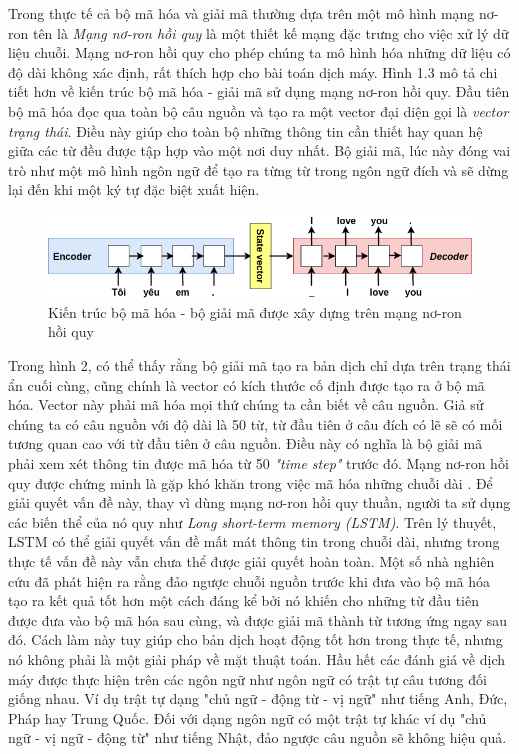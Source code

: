 Trong thực tế cả bộ mã hóa và giải mã thường dựa trên một mô hình mạng nơ-ron tên là \textit{Mạng nơ-ron hồi quy} là một thiết kế mạng đặc trưng cho việc xử lý dữ liệu chuỗi. Mạng nơ-ron hồi quy cho phép chúng ta mô hình hóa những dữ liệu có độ dài không xác định, rất thích hợp cho bài toán dịch máy. Hình 1.3 mô tả chi tiết hơn về kiến trúc bộ mã hóa - giải mã sử dụng mạng nơ-ron hồi quy. Đầu tiên bộ mã hóa đọc qua toàn bộ câu nguồn và tạo ra một vector đại diện gọi là \textit{vector trạng thái}. Điều này giúp cho toàn bộ những thông tin cần thiết hay quan hệ giữa các từ đều được tập hợp vào một nơi duy nhất. Bộ giải mã, lúc này đóng vai trò như một mô hình ngôn ngữ để tạo ra từng từ trong ngôn ngữ đích và sẽ dừng lại đến khi một ký tự đặc biệt xuất hiện.

\begin{figure}
	\centering
	\includegraphics[width=\textwidth]{encoder-decoder}
	\caption[Kiến trúc bộ mã hóa - bộ giải mã được xây dựng trên mạng nơ-ron hồi quy]{Kiến trúc bộ mã hóa - bộ giải mã được xây dựng trên mạng nơ-ron hồi quy}
	\label{fig_encoder_decoder_details}
\end{figure}

Trong hình 2, có thể thấy rằng bộ giải mã tạo ra bản dịch chỉ dựa trên trạng thái ẩn cuối cùng, cũng chính là vector có kích thước cố định được tạo ra ở bộ mã hóa. Vector này phải mã hóa mọi thứ chúng ta cần biết về câu nguồn. Giả sử chúng ta có câu nguồn với độ dài là 50 từ, từ đầu tiên ở câu đích có lẽ sẽ có mối tương quan cao với từ đầu tiên ở câu nguồn. Điều này có nghĩa là bộ giải mã phải xem xét thông tin được mã hóa từ 50 \textit{"time step"} trước đó. Mạng nơ-ron hồi quy được chứng minh là gặp khó khăn trong việc mã hóa những chuỗi dài \cite{difficultyRNN}. Để giải quyết vấn đề này, thay vì dùng mạng nơ-ron hồi quy thuần, người ta sử dụng các biến thể của nó quy như \textit{Long short-term memory (LSTM)}. Trên lý thuyết, LSTM có thể giải quyết vấn đề mất mát thông tin trong chuỗi dài, nhưng trong thực tế vấn đề này vẫn chưa thể được giải quyết hoàn toàn. Một số nhà nghiên cứu đã phát hiện ra rằng đảo ngược chuỗi nguồn trước khi đưa vào bộ mã hóa tạo ra kết quả tốt hơn một cách đáng kể \cite{sutskever} bởi nó khiến cho những từ đầu tiên được đưa vào bộ mã hóa sau cùng, và được giải mã thành từ tương ứng ngay sau đó. Cách làm này tuy giúp cho bản dịch hoạt động tốt hơn trong thực tế, nhưng nó không phải là một giải pháp về mặt thuật toán. Hầu hết các đánh giá về dịch máy được thực hiện trên các ngôn ngữ như ngôn ngữ có trật tự câu tương đối giống nhau. Ví dụ trật tự dạng "chủ ngữ - động từ - vị ngữ" như tiếng Anh, Đức, Pháp hay Trung Quốc. Đối với dạng ngôn ngữ có một trật tự khác ví dụ "chủ ngữ - vị ngữ - động từ" như tiếng Nhật, đảo ngược câu nguồn sẽ không hiệu quả.

